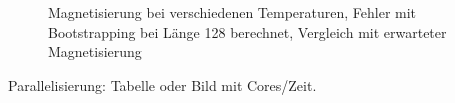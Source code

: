 \documentclass{scrreprt}
\begin{document}
	
	\begin{figure}[htbp]
		
		\label{fig:magnetisierungbootstrap-l-128}
		\caption{Magnetisierung bei verschiedenen Temperaturen, Fehler mit Bootstrapping bei Länge 128 berechnet, Vergleich mit erwarteter Magnetisierung}
	\end{figure}
		
	Parallelisierung: Tabelle oder Bild mit Cores/Zeit.
	\listoffigures
	
	
	
	\printbibliography[heading=bibintoc]
\end{document}
